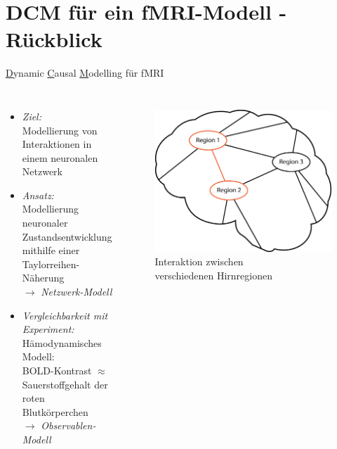 \documentclass{beamer}
\begin{document}
\section{DCM für ein fMRI-Modell - Rückblick}
\begin{frame}[t]{\underline{D}ynamic \underline{C}ausal \underline{M}odelling für fMRI}
	\begin{columns}
		\column[t]{8.3cm}
		\vspace{-0.7 cm}
		\begin{itemize}
			\item \textit{Ziel:} \\Modellierung von Interaktionen in einem neuronalen Netzwerk\\[0.3cm]
			\item \textit{Ansatz:} \\Modellierung neuronaler Zustandsentwicklung mithilfe einer Taylorreihen-Näherung\\$ \longrightarrow $ \textit{Netzwerk-Modell}\\[0.3cm]
			\item \textit{Vergleichbarkeit mit Experiment:} \\ Hämodynamisches Modell:\\ BOLD-Kontrast $\approx$ Sauerstoffgehalt der roten Blutkörperchen\\$ \longrightarrow $ \textit{Observablen-Modell}
		\end{itemize}
		\column[t]{4.5cm}
			\vspace{-0.3 cm}
			\begin{figure}
				\centering
				\includegraphics[width=0.9\linewidth]{res/brain_01.eps}
				\\ {\footnotesize Interaktion zwischen}\\ {\footnotesize verschiedenen Hirnregionen}
			\label{fig:brain_01}
		\end{figure}
	\end{columns}

\end{frame}
\end{document}
